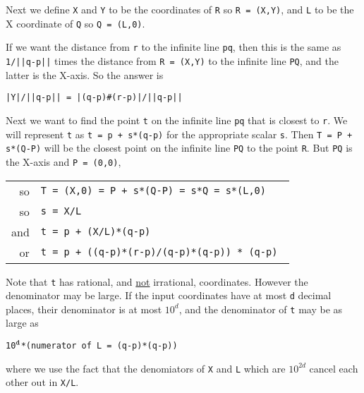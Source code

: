 \documentclass[12pt]{article}
\begin{document}
Next we define {\tt X} and {\tt Y} to be the coordinates of {\tt R}
so {\tt R = (X,Y)}, and {\tt L} to be the X coordinate of {\tt Q}
so {\tt Q = (L,0)}.

If\label{DISTANCE-OF-LINE-TO-POINT}
we want the distance from {\tt r} to the infinite line {\tt pq},
then this is the same as {\tt 1/||q-p||} times
the distance from {\tt R = (X,Y)} to the infinite
line {\tt PQ}, and the latter is the X-axis.  So the answer is \\
\centerline{\tt |Y|/||q-p|| = |(q-p)\#(r-p)|/||q-p||}

Next we want to find the point {\tt t} on the infinite line {\tt pq}
that is closest to {\tt r}.  We will represent {\tt t} as {\tt t = p + s*(q-p)}
for the appropriate scalar {\tt s}.  Then
{\tt T = P + s*(Q-P)} will be the closest point on the infinite
line {\tt PQ} to the point {\tt R}.  But
{\tt PQ} is the X-axis and {\tt P = (0,0)}, \\
\hspace*{0.3in}\begin{tabular}{rl}
so	& \tt T = (X,0) = P + s*(Q-P) = s*Q = s*(L,0) \\
so	& \tt s = X/L \\
and     & \tt t = p + (X/L)*(q-p) \\
or	& \tt t = p + ((q-p)*(r-p)/(q-p)*(q-p)) * (q-p) \\
\end{tabular}

Note that {\tt t} has rational\label{CLOSEST-IS-RATIONAL},
and \underline{not} irrational,
coordinates.  However the denominator may be large.  If
the input coordinates have at most {\tt d} decimal places,
their denominator is at most $10^d$, and the denominator of {\tt t}
may be as large as \\
\centerline{\tt 10$^{\tt d}$*(numerator of L = (q-p)*(q-p))}
where we use the fact that the denomiators of {\tt X} and {\tt L}
which are $10^{2d}$ cancel each other out in {\tt X/L}.


\medskip
\end{document}

